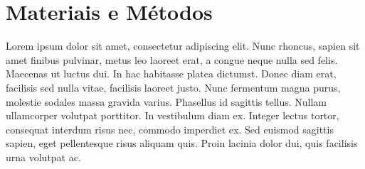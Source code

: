 \section{Materiais e Métodos}

Lorem ipsum dolor sit amet, consectetur adipiscing elit. Nunc rhoncus, sapien sit amet finibus pulvinar, metus leo laoreet erat, a congue neque nulla sed felis. Maecenas ut luctus dui. In hac habitasse platea dictumst. Donec diam erat, facilisis sed nulla vitae, facilisis laoreet justo. Nunc fermentum magna purus, molestie sodales massa gravida varius. Phasellus id sagittis tellus. Nullam ullamcorper volutpat porttitor. In vestibulum diam ex. Integer lectus tortor, consequat interdum risus nec, commodo imperdiet ex. Sed euismod sagittis sapien, eget pellentesque risus aliquam quis. Proin lacinia dolor dui, quis facilisis urna volutpat ac.
